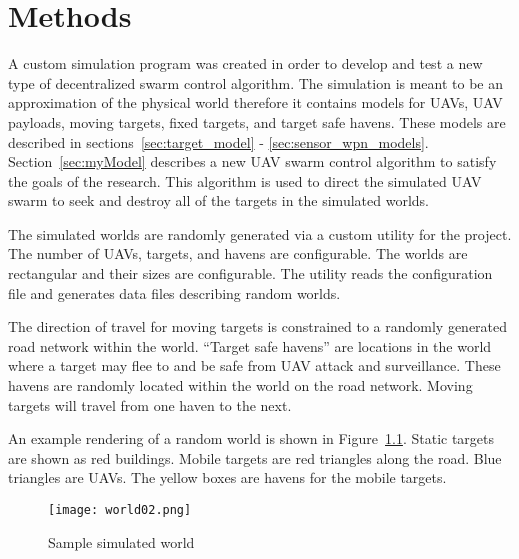 \chapter{Methods}
\label{chap:worldScenModel}

A custom simulation program was created in order to develop and test a new type of decentralized swarm control algorithm. The simulation is meant to be an approximation of the physical world therefore it contains models for UAVs, UAV payloads, moving targets, fixed targets, and target safe havens.  These models are described in sections~\ref{sec:target_model} - \ref{sec:sensor_wpn_models}.  Section~\ref{sec:myModel} describes a new UAV swarm control algorithm to satisfy the goals of the research.  This algorithm is used to direct the simulated UAV swarm to seek and destroy all of the targets in the simulated worlds.

The simulated worlds are randomly generated via a custom utility for the project.  The number of UAVs, targets, and havens are configurable.  The worlds are rectangular and their sizes are configurable.  The utility reads the configuration file and generates data files describing random worlds.  


The direction of travel for moving targets is constrained to a randomly generated road network within the world.  ``Target safe havens'' are locations in the world where a target may flee to and be safe from UAV attack and surveillance.  These havens are randomly located within the world on the road network.  Moving targets will travel from one haven to the next.

An example rendering of a random world is shown in Figure~\ref{fig:sample_world}. Static targets are shown as red buildings.  Mobile targets are red triangles along the road.  Blue triangles are UAVs.  The yellow boxes are havens for the mobile targets.

\begin{figure}[H]
	\centering
	\texttt{[image: world02.png]}
	\caption{Sample simulated world}
	\label{fig:sample_world}
\end{figure}

